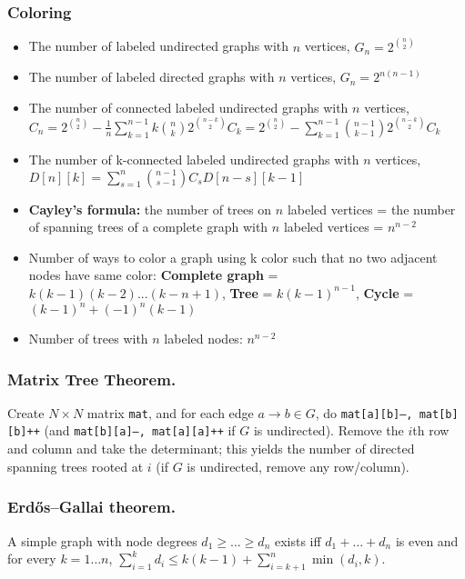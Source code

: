 \begin{small}
  \subsubsection{Coloring}
  \begin{itemize}[noitemsep]
    \itemsep0em 
    \item The number of labeled undirected graphs with \( n \) vertices, \( G_n = 2^{\binom{n}{2}} \)
    \item The number of labeled directed graphs with \( n \) vertices, \( G_n = 2^{n(n - 1)} \)
    \item The number of connected labeled undirected graphs with \( n \) vertices, \( C_n = 2^{\binom{n}{2}} - \frac{1}{n} \sum_{k = 1}^{n - 1} k \binom{n}{k} 2^{\binom{n-k}{2}}C_k = 2^{\binom{n}{2}} - \sum_{k = 1}^{n - 1} \binom{n - 1}{k - 1} 2^{\binom{n-k}{2}}C_k \)
    \item The number of k-connected labeled undirected graphs with \( n \) vertices, \( D[n][k] = \sum_{s = 1}^{n} \binom{n - 1}{s- 1}C_s D[n - s][k - 1] \)
    \item \textbf{Cayley's formula:} the number of trees on \( n \) labeled vertices = the number of spanning trees of a complete graph with \( n \) labeled vertices = \( n^{n - 2} \)
    \item Number of ways to color a graph using k color such that no two adjacent nodes have same color:
    \textbf{Complete graph} = \( k(k-1)(k-2)...(k-n+1) \), \textbf{Tree} = \( k(k - 1)^{n - 1} \), \textbf{Cycle} = \( (k - 1)^n + (-1)^n (k - 1) \)
    \item Number of trees with $ n $ labeled nodes: $ n^{n - 2} $
  \end{itemize}

  \subsubsection{Matrix Tree Theorem.} Create $N\times N$ matrix \texttt{mat}, and for each edge $a \rightarrow b \in G$, do \texttt{mat[a][b]--, mat[b][b]++} (and \texttt{mat[b][a]--, mat[a][a]++} if $G$ is undirected). Remove the $i$th row and column and take the determinant; this yields the number of directed spanning trees rooted at $i$ (if $G$ is undirected, remove any row/column).

  \subsubsection{Erdős–Gallai theorem.} A simple graph with node degrees $d_1 \ge \dots \ge d_n$ exists iff $d_1 + \dots + d_n$ is even and for every $k = 1\dots n$, $\sum _{i=1}^{k}d_{i}\leq k(k-1)+\sum _{i=k+1}^{n}\min(d_{i},k)$.


\end{small}
